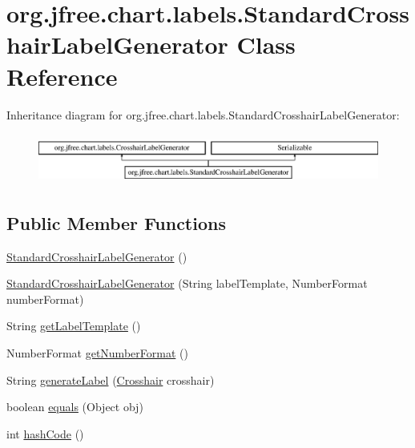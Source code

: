 \hypertarget{classorg_1_1jfree_1_1chart_1_1labels_1_1_standard_crosshair_label_generator}{}\section{org.\+jfree.\+chart.\+labels.\+Standard\+Crosshair\+Label\+Generator Class Reference}
\label{classorg_1_1jfree_1_1chart_1_1labels_1_1_standard_crosshair_label_generator}
Inheritance diagram for org.\+jfree.\+chart.\+labels.\+Standard\+Crosshair\+Label\+Generator\+:\begin{figure}[H]
\begin{center}
\leavevmode
\includegraphics[height=1.661721cm]{classorg_1_1jfree_1_1chart_1_1labels_1_1_standard_crosshair_label_generator}
\end{center}
\end{figure}
\subsection*{Public Member Functions}
\begin{DoxyCompactItemize}
\item 
\mbox{\hyperlink{classorg_1_1jfree_1_1chart_1_1labels_1_1_standard_crosshair_label_generator_a15646cc5649701a3016d74c2f35403bc}{Standard\+Crosshair\+Label\+Generator}} ()
\item 
\mbox{\hyperlink{classorg_1_1jfree_1_1chart_1_1labels_1_1_standard_crosshair_label_generator_a303e652ed7e8ba3c6ed20d267b4bc260}{Standard\+Crosshair\+Label\+Generator}} (String label\+Template, Number\+Format number\+Format)
\item 
String \mbox{\hyperlink{classorg_1_1jfree_1_1chart_1_1labels_1_1_standard_crosshair_label_generator_a0809412006f50c42e83f01933cd127f9}{get\+Label\+Template}} ()
\item 
Number\+Format \mbox{\hyperlink{classorg_1_1jfree_1_1chart_1_1labels_1_1_standard_crosshair_label_generator_a1429cb2f7fd7ae4f38d48d8cdfceca23}{get\+Number\+Format}} ()
\item 
String \mbox{\hyperlink{classorg_1_1jfree_1_1chart_1_1labels_1_1_standard_crosshair_label_generator_a85bf6b7d24554c7421f00887756f0a08}{generate\+Label}} (\mbox{\hyperlink{classorg_1_1jfree_1_1chart_1_1plot_1_1_crosshair}{Crosshair}} crosshair)
\item 
boolean \mbox{\hyperlink{classorg_1_1jfree_1_1chart_1_1labels_1_1_standard_crosshair_label_generator_a97cb21b24a1c1c4f3c7d94afb77b971a}{equals}} (Object obj)
\item 
int \mbox{\hyperlink{classorg_1_1jfree_1_1chart_1_1labels_1_1_standard_crosshair_label_generator_a9805c8b971727614bf8f77fa7a350dc0}{hash\+Code}} ()
\end{DoxyCompactItemize}


